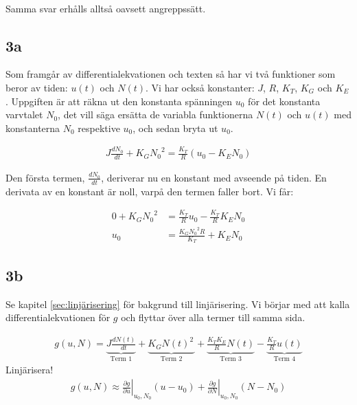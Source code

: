 \documentclass[a4paper]{article}
\begin{document}
\\


Samma svar erhålls alltså oavsett angreppssätt.




\subsection{3a}
Som framgår av differentialekvationen och texten så har vi två funktioner som beror av tiden: $u(t)$ och $N(t)$. Vi har också konstanter: $J$, $R$, $K_T$, $K_G$ och $K_E$. Uppgiften är att räkna ut den konstanta spänningen $u_0$ för det konstanta varvtalet $N_0$, det vill säga ersätta de variabla funktionerna $N(t)$ och $u(t)$ med konstanterna $N_0$ respektive $u_0$, och sedan bryta ut $u_0$.

\begin{align*}
  J \frac{dN_0}{dt} + K_G{N_0}^2 = \frac{K_T}{R}(u_0 - K_EN_0)
\end{align*}

Den första termen, $\frac{dN_0}{dt}$, deriverar nu en konstant med avseende på tiden. En derivata av en konstant är noll, varpå den termen faller bort. Vi får:

\begin{align*}
  0 + K_G{N_0}^2 &= \frac{K_T}{R}u_0 - \frac{K_T}{R}K_EN_0\\
  u_0 &= \frac{K_G{N_0}^2R}{K_T} + K_EN_0
\end{align*}



\subsection{3b}
Se kapitel \ref{sec:linjärisering} för bakgrund till linjärisering. Vi börjar med att kalla differentialekvationen för $g$ och flyttar över alla termer till samma sida.

\begin{align*}
  g(u, N) = \underbrace{J \frac{dN(t)}{dt}}_{\text{Term 1}} + \underbrace{K_G{N(t)}^2\frac{ }{ }}_{\text{Term 2}} + \underbrace{\frac{K_T K_E}{R} N(t)}_{\text{Term 3}} - \underbrace{\frac{K_T}{R}u(t)}_{\text{Term 4}}
\end{align*}
Linjärisera!
\begin{align*}
  g(u, N) \approx \left. \frac{\partial g}{\partial u}\right|_{u_0, N_0}(u - u_0) + \left. \frac{\partial g}{\partial N}\right|_{u_0, N_0}(N - N_0)
\end{align*}
\end{document}
